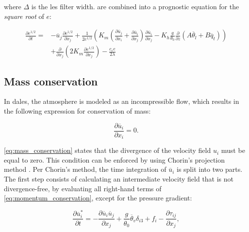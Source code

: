 where $\Delta$ is the \acrshort{les} filter width.  are combined into a prognostic equation for the \emph{square root} of $e$:

\begin{equation}
    \begin{split}
        \frac{\partial e^{1/2}}{\partial t} = &- \overline{u}_j \frac{\partial e^{1/2}}{\partial x_j} + \frac{1}{2e^{1/2}} \left( K_m \left( \frac{\partial \overline{u}_j}{\partial x_i} + \frac{\partial \overline{u}_i}{\partial x_j} \right) \frac{\partial \overline{u}_i}{\partial x_j} - K_h \frac{g}{\theta_0} \frac{\partial}{\partial z} \left( A \overline{\theta}_l + B \overline{q}_t\right) \right) \\ &+ \frac{\partial}{\partial x_j} \left( 2 K_m \frac{\partial e^{1/2}}{\partial x_j}\right) - \frac{c_{\varepsilon} e}{2 \lambda}
    \end{split}
    \end{equation}

\subsection{Mass conservation} \label{sec:dales_poisson}
In \acrshort{dales}, the atmosphere is modeled as an incompressible flow, which results in the following expression for conservation of mass:

\begin{equation}
    \frac{\partial \overline{u}_i}{\partial x_i} = 0. \label{eq:mass_conservation}
\end{equation}

\autoref{eq:mass_conservation} states that the divergence of the velocity field $u_i$ must be equal to zero. This condition can be enforced by using Chorin's projection method \citep{chorinNumericalSolutionNavierStokes1967}. Per Chorin's method, the time integration of $\overline{u}_i$ is split into two parts. The first step consists of calculating an intermediate velocity field that is not divergence-free, by evaluating all right-hand terms of \autoref{eq:momentum_conservation}, except for the pressure gradient:

\begin{equation}
    \frac{\partial \overline{u}^*_i}{\partial t} = - \frac{\partial \overline{u}_i \overline{u}_j}{\partial x_j} + \frac{g}{\theta_0}\overline{\theta}_v \delta_{i3} + f_i - \frac{\partial \tau_{ij}}{\partial x_j}, \label{eq:chorin_step1}
\end{equation}

